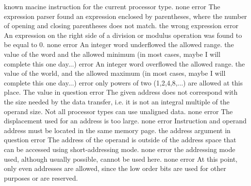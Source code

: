 \documentclass[12pt,twoside]{report}
\begin{document}
\begin{description}
{                known macine instruction for the current processor type.}
               {none}
               {error}
               {The expression parser found an expression enclosed by
                parentheses, where the number of opening and closing
                parentheses does not match.}
               {the wrong expression}
               {error}
               {An expression on the right side of a division or modulus
                operation was found to be equal to 0.}
               {none}
               {error}
               {An integer word underflowed the allowed range.}
               {the value of the word and the allowed minimum (in most
                cases, maybe I will complete this one day...)}
               {error}
               {An integer word overflowed the allowed range.}
               {the value of the world, and the allowed maximum (in most
                cases, maybe I will complete this one day...)}
               {error}
               {only powers of two (1,2,4,8,...) are allowed at this place.}
               {The value in question}
               {error}
               {The given address does not correspond with the size needed
                by the data transfer, i.e. it is not an integral multiple of
                the operand size. Not all processor types can use unaligned
                data.}
               {none}
               {error}
               {The displacement used for an address is too large.}
               {none}
               {error}
               {Instruction and operand address must be located in the
                same memory page.}
               {the address argument in question}
               {error}
               {The address of the operand is outside of the address space
                that can be accessed using short-addressing mode.}
               {none}
               {error}
               {the addressing mode used, although usually possible,
                cannot be used here.}
               {none}
               {error}
               {At this point, only even addresses are allowed, since the
                low order bits are used for other purposes or are reserved.}

\end{description}
\end{document}
